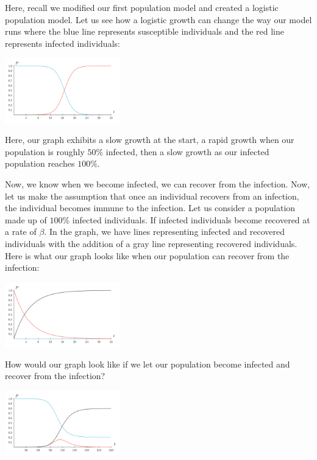 \documentclass{amsart}
\theoremstyle{definition}
\numberwithin{equation}{section}
\begin{document}
\begin{sansmath}
Here, recall we modified our first population model and created a logistic population model. Let us see how a logistic growth can change the way our model runs where the blue line represents susceptible individuals and the red line represents infected individuals:

\begin{center}
  \includegraphics[width=5cm]{SIRLogistic}
\end{center}

Here, our graph exhibits a slow growth at the start, a rapid growth when our population is roughly $50\%$ infected, then a slow growth as our infected population reaches $100\%$.

Now, we know when we become infected, we can recover from the infection. Now, let us make the assumption that once an individual recovers from an infection, the individual becomes immune to the infection. Let us consider a population made up of $100\%$ infected individuals. If infected individuals become recovered at a rate of $\beta$. In the graph, we have lines representing infected and recovered individuals with the addition of a gray line representing recovered individuals. Here is what our graph looks like when our population can recover from the infection:

\begin{center}
  \includegraphics[width=5cm]{SIRDecay}
\end{center}

How would our graph look like if we let our population become infected and recover from the infection?

\begin{center}
  \includegraphics[width=5cm]{SIRGraph}
\end{center}


\end{sansmath}
\end{document}

